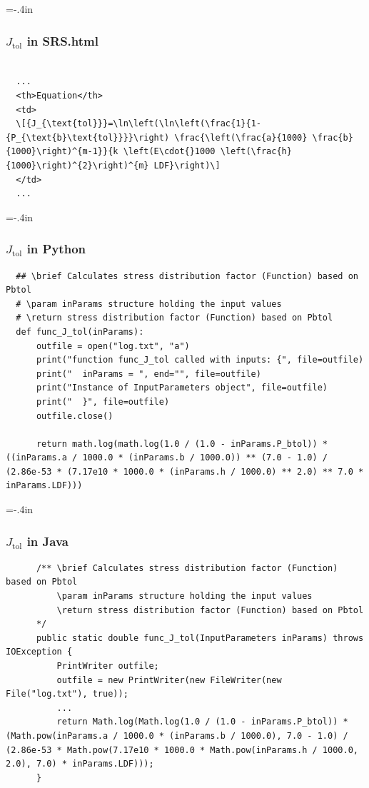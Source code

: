 \documentclass[usenames,dvipsnames]{beamer}
\begin{document}
\hoffset=0in %
\hoffset=-.4in %
\begin{frame}
  
  \frametitle{$J_{\mbox{tol}}$ in SRS.html}
  
  \begin{lstlisting}
  
  ...
  <th>Equation</th>
  <td>
  \[{J_{\text{tol}}}=\ln\left(\ln\left(\frac{1}{1-{P_{\text{b}\text{tol}}}}\right) \frac{\left(\frac{a}{1000} \frac{b}{1000}\right)^{m-1}}{k \left(E\cdot{}1000 \left(\frac{h}{1000}\right)^{2}\right)^{m} LDF}\right)\]
  </td>
  ...
  \end{lstlisting}
  
\end{frame}
\hoffset=0in %
\hoffset=-.4in %
\begin{frame}
  
  \frametitle{$J_{\mbox{tol}}$ in Python}
  
  \begin{lstlisting}
  ## \brief Calculates stress distribution factor (Function) based on Pbtol
  # \param inParams structure holding the input values
  # \return stress distribution factor (Function) based on Pbtol
  def func_J_tol(inParams):
      outfile = open("log.txt", "a")
      print("function func_J_tol called with inputs: {", file=outfile)
      print("  inParams = ", end="", file=outfile)
      print("Instance of InputParameters object", file=outfile)
      print("  }", file=outfile)
      outfile.close()
      
      return math.log(math.log(1.0 / (1.0 - inParams.P_btol)) * ((inParams.a / 1000.0 * (inParams.b / 1000.0)) ** (7.0 - 1.0) / (2.86e-53 * (7.17e10 * 1000.0 * (inParams.h / 1000.0) ** 2.0) ** 7.0 * inParams.LDF)))
  \end{lstlisting}
\end{frame}
\hoffset=0in %
\hoffset=-.4in %
\begin{frame}
  
  \frametitle{$J_{\mbox{tol}}$ in Java}
  
  \begin{lstlisting}
      /** \brief Calculates stress distribution factor (Function) based on Pbtol
          \param inParams structure holding the input values
          \return stress distribution factor (Function) based on Pbtol
      */
      public static double func_J_tol(InputParameters inParams) throws IOException {
          PrintWriter outfile;
          outfile = new PrintWriter(new FileWriter(new File("log.txt"), true));
          ...
          return Math.log(Math.log(1.0 / (1.0 - inParams.P_btol)) * (Math.pow(inParams.a / 1000.0 * (inParams.b / 1000.0), 7.0 - 1.0) / (2.86e-53 * Math.pow(7.17e10 * 1000.0 * Math.pow(inParams.h / 1000.0, 2.0), 7.0) * inParams.LDF)));
      }
  \end{lstlisting}
\end{frame}
\end{document}
